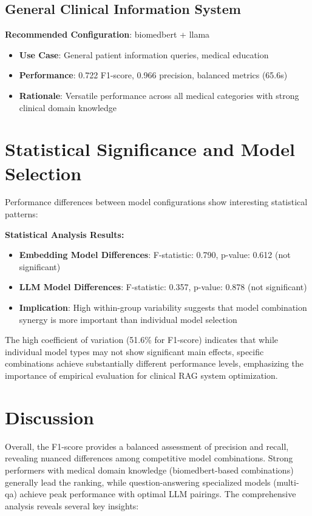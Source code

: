 \subsection{General Clinical Information System}
\textbf{Recommended Configuration}: biomedbert + llama
\begin{itemize}
    \item \textbf{Use Case}: General patient information queries, medical education
    \item \textbf{Performance}: 0.722 F1-score, 0.966 precision, balanced metrics (65.6s)
    \item \textbf{Rationale}: Versatile performance across all medical categories with strong clinical domain knowledge
\end{itemize}

\section{Statistical Significance and Model Selection}



Performance differences between model configurations show interesting statistical patterns:

\textbf{Statistical Analysis Results:}
\begin{itemize}
    \item \textbf{Embedding Model Differences}: F-statistic: 0.790, p-value: 0.612 (not significant)
    \item \textbf{LLM Model Differences}: F-statistic: 0.357, p-value: 0.878 (not significant)
    \item \textbf{Implication}: High within-group variability suggests that model combination synergy is more important than individual model selection
\end{itemize}

The high coefficient of variation (51.6\% for F1-score) indicates that while individual model types may not show significant main effects, specific combinations achieve substantially different performance levels, emphasizing the importance of empirical evaluation for clinical RAG system optimization.

\section{Discussion}
Overall, the F1-score provides a balanced assessment of precision and recall, revealing nuanced differences among competitive model combinations. Strong performers with medical domain knowledge (biomedbert-based combinations) generally lead the ranking, while question-answering specialized models (multi-qa) achieve peak performance with optimal LLM pairings. The comprehensive analysis reveals several key insights:

